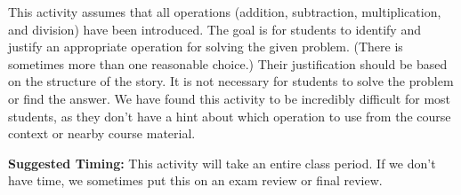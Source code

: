 \documentclass{ximera}
\begin{document}
\newpage
\begin{instructorNotes}
This activity assumes that all operations (addition, subtraction, multiplication, and division) have been introduced.  The goal is for students to identify and justify an appropriate operation for solving the given problem. (There is sometimes more than one reasonable choice.) Their justification should be based on the structure of the story. It is not necessary for students to solve the problem or find the answer.  We have found this activity to be incredibly difficult for most students, as they don't have a hint about which operation to use from the course context or nearby course material.

{\bf Suggested Timing:} This activity will take an entire class period.  If we don't have time, we sometimes put this on an exam review or final review.
\end{instructorNotes}
\end{document}

